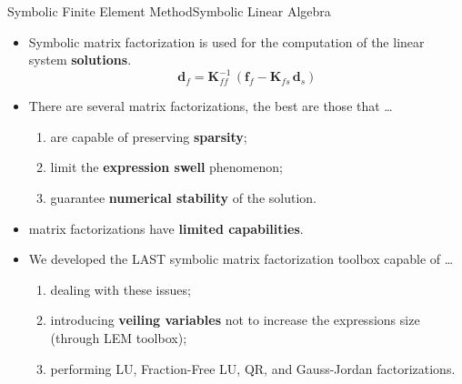 \begin{frame}{Symbolic Finite Element Method}{Symbolic Linear Algebra}
  \begin{itemize}
    \item Symbolic matrix factorization is used for the computation of the linear system \textbf{solutions}.
    \begin{equation*}
      \mathbf{d}_{f} = \mathbf{K}_{f\!f}^{-1}\,\left(\mathbf{f}_{f} - \mathbf{K}_{f\!s}\,\mathbf{d}_{s}\right)
    \end{equation*}
    \item There are several matrix factorizations, the best are those that \dots
    \begin{enumerate}
      \item are capable of preserving \textbf{sparsity};
      \item limit the \textbf{expression swell} phenomenon;
      \item guarantee \textbf{numerical stability} of the solution.
    \end{enumerate}
    \item \Maple{} matrix factorizations have \textbf{limited capabilities}.
    \item We developed the \ac{LAST} symbolic matrix factorization toolbox capable of \dots
    \begin{enumerate}
      \item dealing with these \Maple{} issues;
      \item introducing \textbf{veiling variables} not to increase the expressions size (through \ac{LEM} toolbox);
      \item performing LU, Fraction-Free LU, QR, and Gauss-Jordan factorizations.
    \end{enumerate}
  \end{itemize}
\end{frame}

